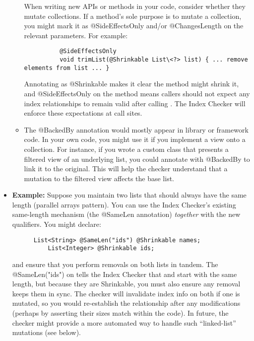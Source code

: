 \begin{itemize}
\begin{itemize}
      When writing new APIs or methods in your code, consider whether they mutate collections. If a method’s sole
      purpose is to mutate a collection, you might mark it as @SideEffectsOnly and/or @ChangesLength on the
      relevant parameters. For example:
        \begin{Verbatim}
          @SideEffectsOnly
          void trimList(@Shrinkable List\<?> list) { ... remove elements from list ... }
        \end{Verbatim}
      Annotating  as @Shrinkable makes it clear the method might shrink it, and @SideEffectsOnly
      on the method means callers should not expect any index relationships to remain valid after calling
      . The Index Checker will enforce these expectations at call sites.
    \item
      The @BackedBy annotation would mostly appear in library or framework code. In your own code, you might use
      it if you implement a view onto a collection. For instance, if you wrote a custom class 
      that presents a filtered view of an underlying list, you could annotate  with @BackedBy
      to link it to the original. This will help the checker understand that a mutation to the filtered view
      affects the base list.
  \end{itemize}
\item
  \textbf{Example:}
    Suppose you maintain two lists that should always have the same length (parallel arrays pattern).
    You can use the Index Checker’s existing same-length mechanism (the @SameLen annotation)
    \emph{together} with the new qualifiers. You might declare:

    \begin{Verbatim}
      List<String> @SameLen("ids") @Shrinkable names;
          List<Integer> @Shrinkable ids;
        \end{Verbatim}
      and ensure that you perform removals on both lists in tandem. The @SameLen("ids") on 
      tells the Index Checker that  and  start with the same length, but because
      they are Shrinkable, you must also ensure any removal keeps them in sync. The checker will
      invalidate index info on both if one is mutated, so you would re-establish the relationship
      after any modifications (perhaps by asserting their sizes match within the code). In future, the
      checker might provide a more automated way to handle such “linked-list” mutations (see below).


\end{itemize}
